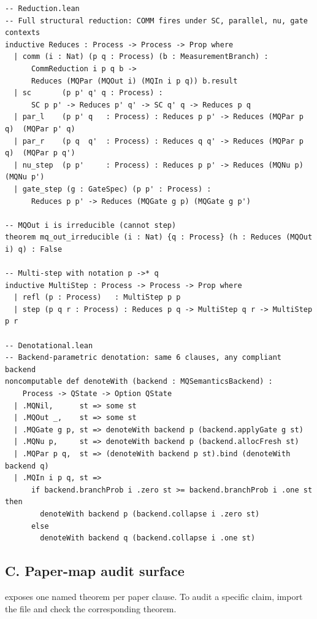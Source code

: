 \documentclass[11pt]{article}
\newcommand{\codepath}[1]{\path{#1}}
\begin{document}
\begin{lstlisting}[language={},caption={Reduction (\texttt{Reduction.lean}) and denotation (\texttt{Denotational.lean})}]
-- Reduction.lean
-- Full structural reduction: COMM fires under SC, parallel, nu, gate contexts
inductive Reduces : Process -> Process -> Prop where
  | comm (i : Nat) (p q : Process) (b : MeasurementBranch) :
      CommReduction i p q b ->
      Reduces (MQPar (MQOut i) (MQIn i p q)) b.result
  | sc       (p p' q' q : Process) :
      SC p p' -> Reduces p' q' -> SC q' q -> Reduces p q
  | par_l    (p p' q   : Process) : Reduces p p' -> Reduces (MQPar p q)  (MQPar p' q)
  | par_r    (p q  q'  : Process) : Reduces q q' -> Reduces (MQPar p q)  (MQPar p q')
  | nu_step  (p p'     : Process) : Reduces p p' -> Reduces (MQNu p)     (MQNu p')
  | gate_step (g : GateSpec) (p p' : Process) :
      Reduces p p' -> Reduces (MQGate g p) (MQGate g p')

-- MQOut i is irreducible (cannot step)
theorem mq_out_irreducible (i : Nat) {q : Process} (h : Reduces (MQOut i) q) : False

-- Multi-step with notation p ->* q
inductive MultiStep : Process -> Process -> Prop where
  | refl (p : Process)   : MultiStep p p
  | step (p q r : Process) : Reduces p q -> MultiStep q r -> MultiStep p r

-- Denotational.lean
-- Backend-parametric denotation: same 6 clauses, any compliant backend
noncomputable def denoteWith (backend : MQSemanticsBackend) :
    Process -> QState -> Option QState
  | .MQNil,      st => some st
  | .MQOut _,    st => some st
  | .MQGate g p, st => denoteWith backend p (backend.applyGate g st)
  | .MQNu p,     st => denoteWith backend p (backend.allocFresh st)
  | .MQPar p q,  st => (denoteWith backend p st).bind (denoteWith backend q)
  | .MQIn i p q, st =>
      if backend.branchProb i .zero st >= backend.branchProb i .one st then
        denoteWith backend p (backend.collapse i .zero st)
      else
        denoteWith backend q (backend.collapse i .one st)
\end{lstlisting}

\subsection*{C. Paper-map audit surface}

\codepath{PaperMap.lean} exposes one named theorem per paper clause.
To audit a specific claim, import the file and check the corresponding theorem.
\end{document}
